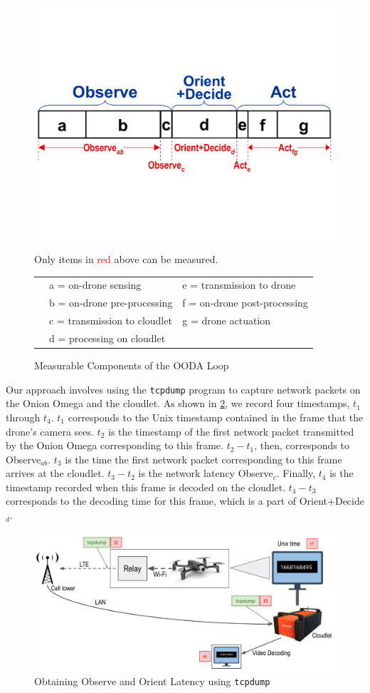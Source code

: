 \begin{figure}[htbp]
    \centering
\includegraphics[width = .5\textwidth]{figs/fig-ooda-nomenclature.pdf}
	\begin{captext}
		\centering Only items in \textcolor{red}{red} above can be measured.
		\begin{tabular}{lll}
			\phantom{00} & a = on-drone sensing & e = transmission to drone\\
			\phantom{00} & b = on-drone pre-processing & f = on-drone post-processing\\
			\phantom{00} & c = transmission to cloudlet & g = drone actuation\\
			\phantom{00} & d = processing on cloudlet\\
		\end{tabular}
	\end{captext}
\caption{Measurable Components of the OODA Loop}
\label{fig:ooda-nomenclature}
\end{figure}

Our approach involves using the \texttt{tcpdump} program to capture network
packets on the Onion Omega and the cloudlet. As shown in
\cref{fig:exp2-method}, we record four timestamps, $t_1$ through $t_4$. $t_1$
corresponds to the Unix timestamp contained in the frame that the drone's
camera sees. $t_2$ is the timestamp of the first network packet transmitted by
the Onion Omega corresponding to this frame. $t_2-t_1$, then, corresponds to
Observe$_{ab}$.  $t_3$ is the time the first network packet corresponding to
this frame arrives at the cloudlet. $t_3-t_2$ is the network latency
Observe$_c$. Finally, $t_4$ is the timestamp recorded when this frame is
decoded on the cloudlet.  $t_4-t_3$ corresponds to the decoding time for this
frame, which is a part of Orient+Decide$_d$.

\begin{figure}[htbp]
    \centerline{\includegraphics[width = .8\textwidth]{figs/fig-exp2-method-crop.pdf}}
    \caption{Obtaining Observe and Orient Latency using \texttt{tcpdump}}
\label{fig:exp2-method}
\end{figure}


